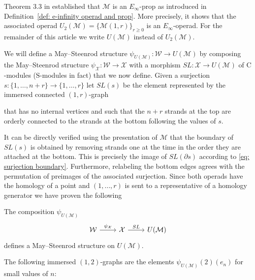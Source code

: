 Theorem 3.3 in \cite{medina2020prop1} established that $\mathcal M$ is an $E_\infty$-prop as introduced in Definition~\ref{def: e-infinity operad and prop}.
More precisely, it shows that the associated operad $U_2(\mathcal M) = \big\{ \mathcal M(1, r) \big\}_{r \geq 0}$ is an $E_\infty$-operad.
For the remainder of this article we write $U(\mathcal M)$ instead of $U_2(\mathcal M)$.

We will define a May--Steenrod structure $\psi_{U(\mathcal M)} \colon \mathcal W \to U(\mathcal M)$ by composing the May--Steenrod structure $\psi_{\mathcal X} \colon \mathcal W \to \mathcal X$ with a morphism $SL \colon \mathcal X \to U(\mathcal M)$ of $\mathrm{C}$-modules ($\mathrm{S}$-modules in fact) that we now define.
Given a surjection $s \colon \{1, \dots, n+r\} \to \{1, \dots, r\}$ let $SL(s)$ be the element represented by the immersed connected $(1,r)$-graph

\begin{center}
	
\end{center}

that has no internal vertices and such that the $n+r$ strands at the top are orderly connected to the strands at the bottom following the values of $s$.

It can be directly verified using the presentation of $\mathcal M$ that the boundary of $SL(s)$ is obtained by removing strands one at the time in the order they are attached at the bottom.
This is precisely the image of $SL(\partial s)$ according to \eqref{eq: surjection boundary}.
Furthermore, relabeling the bottom edges agrees with the permutation of preimages of the associated surjection.
Since both operads have the homology of a point and $(1, \dots, r)$ is sent to a representative of a homology generator we have proven the following

\begin{theorem} \label{thm: Steenrod-Adem on U(M)}
	The composition $\psi_{U(\mathcal M)}$
	\begin{equation*}
	\begin{tikzcd}[column sep = normal]
	\mathcal W \arrow[r, "\psi_{\mathcal X}"] & \mathcal X \arrow[r, "SL"] & U(\mathcal M)
	\end{tikzcd}
	\end{equation*}
	defines a May--Steenrod structure on $U(\mathcal M)$.
\end{theorem}

\begin{example}
	The following immersed $(1,2)$-graphs are the elements $\psi_{U(\mathcal M)}(2)(e_n)$ for small values of $n$:
	\begin{center}
		
	\end{center}
\end{example}

